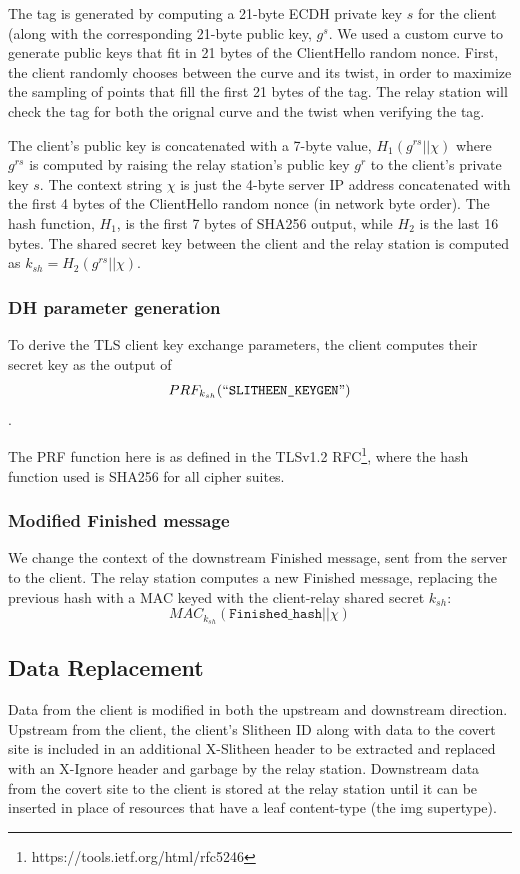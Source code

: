\documentclass[11pt]{article}
\theoremstyle{definittion}
\begin{document}
The tag is generated by computing a 21-byte ECDH private key $s$ for the client (along with the corresponding 21-byte public key, $g^s$. We used a custom curve to generate public keys that fit in 21 bytes of the ClientHello random nonce. First, the client randomly chooses between the curve and its twist, in order to maximize the sampling of points that fill the first 21 bytes of the tag. The relay station will check the tag for both the orignal curve and the twist when verifying the tag.

The client's public key is concatenated with a 7-byte value, $H_1(g^{rs} || \chi)$ where $g^{rs}$ is computed by raising the relay station's public key $g^r$ to the client's private key $s$. The context string $\chi$ is just the 4-byte server IP address concatenated with the first 4 bytes of the ClientHello random nonce (in network byte order). The hash function, $H_1$, is the first 7 bytes of SHA256 output, while $H_2$ is the last 16 bytes. The shared secret key between the client and the relay station is computed as $k_{sh} = H_2(g^{rs}||\chi)$.

\subsubsection{DH parameter generation}

To derive the TLS client key exchange parameters, the client computes their secret key as the output of $$PRF_{k_{sh}}(``\texttt{SLITHEEN\_KEYGEN}")$$.

The PRF function here is as defined in the TLSv1.2 RFC\footnote{https://tools.ietf.org/html/rfc5246}, where the hash function used is SHA256 for all cipher suites.

\subsubsection{Modified Finished message}

We change the context of the downstream Finished message, sent from the server to the client. The relay station computes a new Finished message, replacing the previous hash with a MAC keyed with the client-relay shared secret $k_{sh}$:
$$MAC_{k_{sh}}(\texttt{Finished\_hash} || \chi) $$


\subsection{Data Replacement}

Data from the client is modified in both the upstream and downstream direction. Upstream from the client, the client's Slitheen ID along with data to the covert site is included in an additional X-Slitheen header to be extracted and replaced with an X-Ignore header and garbage by the relay station.
Downstream data from the covert site to the client is stored at the relay station until it can be inserted in place of resources that have a leaf content-type (the img supertype).
\end{document}
